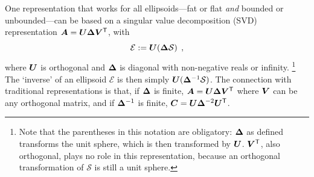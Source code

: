 One representation that works for all ellipsoids---fat or flat \emph{and} bounded or unbounded---can be based on 
a singular value decomposition (SVD) representation
$\bm{A}  = \bm{U} \bm{\Delta} \bm{V}^\mathsf{T}$, with
\begin{equation}
 \mathcal{E} := \bm{U} (\bm{\Delta} \mathcal{S}) \:\: ,
\end{equation}
where $\bm{U}$ is orthogonal and $\bm{\Delta}$ is diagonal with non-negative reals or infinity.%
\footnote{
Note that the parentheses in this notation are obligatory: $\bm{\Delta}$ as defined transforms the
unit sphere, which is then transformed by $\bm{U}$. $\bm{V}^\mathsf{T}$, also orthogonal, plays no role
in this representation, because an orthogonal transformation of $\mathcal{S}$ is still a unit sphere.
}
The `inverse' of an ellipsoid $\mathcal{E}$ is then simply $\bm{U} (\bm{\Delta}^{-1} \mathcal{S})$.
The connection with traditional representations is that,
if $\bm{\Delta}$ is finite,
$\bm{A}  = \bm{U} \bm{\Delta} \bm{V}^\mathsf{T}$
where $\bm{V}$ can be any orthogonal matrix, and
if $\bm{\Delta}^{-1}$ is finite, $\bm{C} = \bm{U} \bm{\Delta}^{-2} \bm{U}^\mathsf{T}$.

